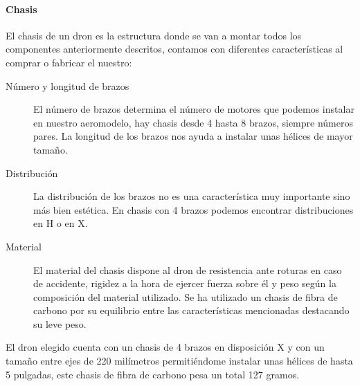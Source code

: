 
\paragraph{Chasis}
\label{SSS:Chasis}

	El chasis de un dron es la estructura donde se van a montar todos los componentes anteriormente descritos, contamos con diferentes características al comprar o fabricar el nuestro:
	
	\begin{description}
	\item[Número y longitud de brazos] El número de brazos determina el número de motores que podemos instalar en nuestro aeromodelo, hay chasis desde 4 hasta 8 brazos, siempre números pares.
	La longitud de los brazos nos ayuda a instalar unas hélices de mayor tamaño.
	\item[Distribución] La distribución de los brazos no es una característica muy importante sino más bien estética. En chasis con 4 brazos podemos encontrar distribuciones en H o en X.
%	
%  
	\item[Material]
	El material del chasis dispone al dron de resistencia ante roturas en caso de accidente, rigidez a la hora de ejercer fuerza sobre él y peso según la composición del material utilizado.
	Se ha utilizado un chasis de fibra de carbono por su equilibrio entre las características mencionadas destacando su leve peso.
	\end{description}
	
		
	El dron elegido cuenta con un chasis de 4 brazos en disposición X y con un tamaño entre ejes de 220 milímetros permitiéndome instalar unas hélices de hasta 5 pulgadas, este chasis de fibra de carbono pesa un total 127 gramos.
		

